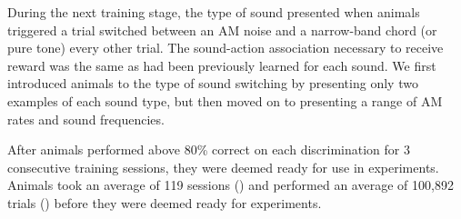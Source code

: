 During the next training stage, the type of sound presented when animals
triggered a trial switched between an AM noise and a narrow-band chord (or pure
tone) every other trial.
%
The sound-action association necessary to receive reward was the same as had
been previously learned for each sound.
%
We first introduced animals to the type of sound switching by presenting only
two examples of each sound type, but then moved on to presenting a range of AM
rates and sound frequencies.

%

After animals performed above 80\% correct on each discrimination for 3 consecutive training sessions, they were deemed ready for use in experiments. 
%
Animals took an average of 119 sessions (\fig{\TrainingSessions}) and performed an average of 100,892 trials (\fig{\TrainingTrials}) before they were deemed ready for experiments.

